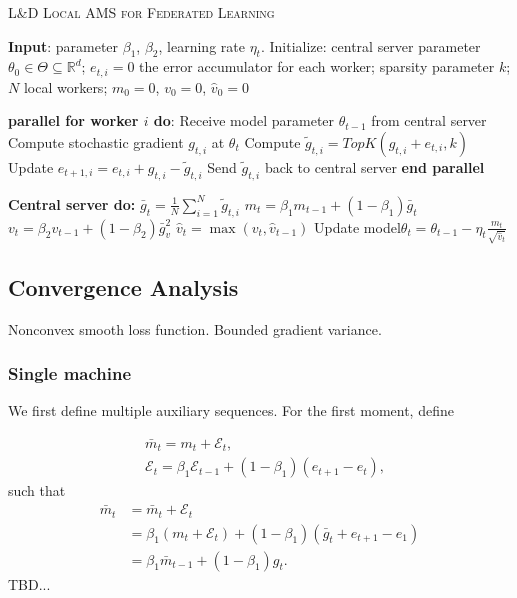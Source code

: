 \documentclass{article}
\begin{document}
\begin{algorithm}[H]
\caption{\textsc{L\&D Local AMS for Federated Learning}} \label{alg:ldams}
\begin{algorithmic}[1]

\STATE \textbf{Input}: parameter $\beta_1$, $\beta_2$, learning rate $\eta_t$. 
\STATE Initialize: central server parameter $\theta_{0} \in \Theta \subseteq \mathbb R^d$; $e_{t,i}=0$ the error accumulator for each worker; sparsity parameter $k$; $N$ local workers; $m_0=0$, $v_0=0$, $\hat v_0=0$


\STATE\textbf{parallel for worker $i$ do}:
\STATE\quad Receive model parameter $\theta_{t-1}$ from central server
\STATE\quad  Compute stochastic gradient $g_{t,i}$ at $\theta_t$
\STATE\quad  Compute $\tilde g_{t,i}=TopK(g_{t,i}+e_{t,i},k)$
\STATE\quad  Update $e_{t+1,i}=e_{t,i}+g_{t,i}-\tilde g_{t,i}$
\STATE\quad  Send $\tilde g_{t,i}$ back to central server
\STATE \textbf{end parallel}

\STATE \textbf{Central server do:}
\STATE $\bar g_{t}=\frac{1}{N}\sum_{i=1}^N \tilde g_{t,i}$
\STATE $m_t=\beta_1 m_{t-1}+(1-\beta_1)\bar g_t$
\STATE $v_t=\beta_2 v_{t-1}+(1-\beta_2)\bar g_v^2$
\STATE $\hat v_t=\max(v_t,\hat v_{t-1})$
\STATE Update model$\theta_t=\theta_{t-1}-\eta_t\frac{m_t}{\sqrt{\hat v_t}}$

\ENDFOR
\end{algorithmic}
\end{algorithm}


\subsection{Convergence Analysis}
Nonconvex smooth loss function. Bounded gradient variance.

\subsubsection{Single machine}
We first define multiple auxiliary sequences. For the first moment, define

\begin{align*}
    &\bar m_t=m_t+\mathcal E_t,\\
    &\mathcal E_t=\beta_1\mathcal E_{t-1}+(1-\beta_1)(e_{t+1}-e_t),
\end{align*}
such that 
\begin{align*} 
    \bar m_t&=\bar m_t+\mathcal E_t\\
    &=\beta_1(m_t+\mathcal E_t)+(1-\beta_1)(\bar g_t+e_{t+1}-e_1)\\
    &=\beta_1\bar m_{t-1}+(1-\beta_1)g_t.
\end{align*}
TBD...
\end{document}

